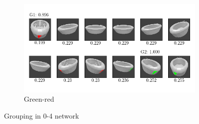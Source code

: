 \begin{figure}
\begin{subfigure}{\textwidth}
	\end{subfigure}
	\begin{subfigure}{\textwidth}
		\includegraphics[trim=10 20 10 20, clip]{images/mn-sl-0-4-20/bathtub_0107_3_grouping.png}
		\caption{Green-red}
		\label{fig:grouping-0-4-green-red}
	\end{subfigure}
	\caption[Grouping in 0-4 network]{Grouping in 0-4 network}
	\label{fig:grouping-0-4}
\end{figure}

